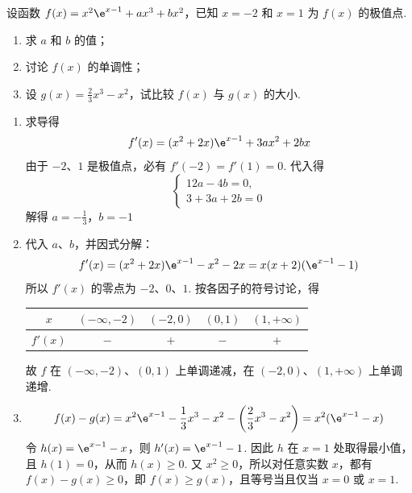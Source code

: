 \begin{problem}
设函数 \( f(x) = x^{2}\e^{x - 1} + ax^{3} + bx^{2} \)，已知 \( x = -2 \) 和 \( x = 1 \) 为 \( f(x) \) 的极值点.
\begin{enumerate}
\item 求 \(a\) 和 \(b\) 的值；
\item 讨论 \( f(x) \) 的单调性；
\item 设 \( g(x)=\frac{2}{3}x^{3}-x^{2} \)，试比较 \( f(x) \) 与 \( g(x) \) 的大小.
\end{enumerate}
\end{problem}

\begin{solution}
\begin{enumerate}
\item 求导得
\[
f'(x)=(x^2+2x)\e^{x-1}+3ax^2+2bx
\]
由于 \(-2\)、\(1\) 是极值点，必有 \(f'(-2)=f'(1)=0\). 代入得
\[
\begin{cases}
12a-4b=0,\\
3+3a+2b=0
\end{cases}
\]
解得
\(a=-\frac13\)，\(b=-1\)
\item 代入 \(a\)、\(b\)，并因式分解：
\[
f'(x)=(x^2+2x)\e^{x-1}-x^2-2x
=x(x+2)(\e^{x-1}-1)
\]
所以 \(f'(x)\) 的零点为 \(-2\)、\(0\)、\(1\). 按各因子的符号讨论，得
\begin{center}
\begin{tabular}{c|cccc}
\(x\) & \((-\infty,-2)\) & \((-2,0)\) & \((0,1)\) & \((1,+\infty)\) \\ \hline
\(f'(x)\) & \(-\) & \(+\) & \(-\) & \(+\)
\end{tabular}
\end{center}
故 \(f\) 在 \((-\infty,-2)\)、\((0,1)\) 上单调递减，在 \((-2,0)\)、\((1,+\infty)\) 上单调递增.
\item
\[
f(x)-g(x)
=x^2\e^{x-1}-\frac13x^3-x^2-\left(\frac23x^3-x^2\right)
=x^2(\e^{x-1}-x)
\]
令 \(h(x)=\e^{x-1}-x\)，则 \(h'(x)=\e^{x-1}-1\). 因此 \(h\) 在 \(x=1\) 处取得最小值，且 \(h(1)=0\)，从而 \(h(x)\geqslant0\). 又 \(x^2\geqslant0\)，所以对任意实数 \(x\)，都有 \(f(x)-g(x)\geqslant0\)，即 \(f(x)\geqslant g(x)\)，且等号当且仅当 \(x=0\) 或 \(x=1\).
\end{enumerate}
\end{solution}

